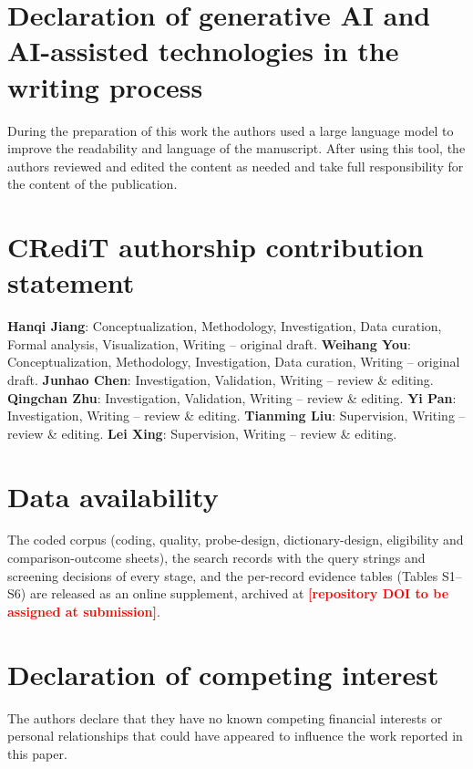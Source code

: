 \documentclass[final,3p,times,twocolumn,number,sort, compress]{elsarticle}
\newcommand{\tbd}[1]{\textcolor{red}{\textbf{[#1]}}}
\begin{document}







\FloatBarrier



\FloatBarrier


\section*{Declaration of generative AI and AI-assisted technologies in the writing process}
During the preparation of this work the authors used a large language model to improve the readability and language of the manuscript. After using this tool, the authors reviewed and edited the content as needed and take full responsibility for the content of the publication.

\section*{CRediT authorship contribution statement}
\textbf{Hanqi Jiang}: Conceptualization, Methodology, Investigation, Data curation, Formal analysis,
Visualization, Writing -- original draft. \textbf{Weihang You}: Conceptualization, Methodology,
Investigation, Data curation, Writing -- original draft. \textbf{Junhao Chen}: Investigation,
Validation, Writing -- review \& editing. \textbf{Qingchan Zhu}: Investigation, Validation, Writing --
review \& editing. \textbf{Yi Pan}: Investigation, Writing -- review \& editing. \textbf{Tianming
Liu}: Supervision, Writing -- review \& editing. \textbf{Lei Xing}: Supervision, Writing -- review \&
editing.

\section*{Data availability}
The coded corpus (coding, quality, probe-design, dictionary-design, eligibility and comparison-outcome sheets), the search records with the query strings and screening decisions of every stage, and the per-record evidence tables (Tables S1--S6) are released as an online supplement, archived at \tbd{repository DOI to be assigned at submission}.

\section*{Declaration of competing interest}
The authors declare that they have no known competing financial interests or personal relationships that could have appeared to influence the work reported in this paper.
\end{document}
